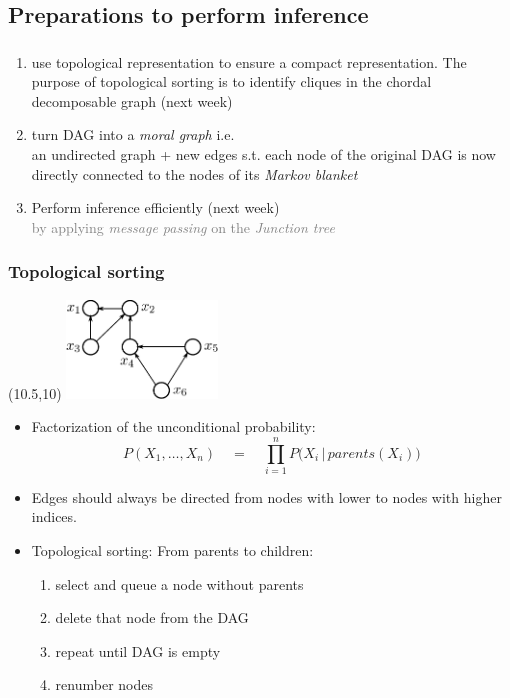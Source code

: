 \subsection{Preparations to perform inference}

\begin{frame}\frametitle{\subsecname}
    
    \begin{enumerate}
     \item use topological representation to ensure a compact representation.
     The purpose of topological sorting is to identify cliques in the chordal decomposable graph (next week)
     \item turn DAG into a \emph{moral graph} i.e. \\
     an undirected graph + new edges s.t. each node of the original DAG is now directly connected to the nodes of its \emph{Markov blanket}
     \item Perform inference efficiently (next week)\\
     \textcolor{gray}{ by applying \emph{message passing} on the \emph{Junction tree}}
    \end{enumerate}
    
\end{frame}


\begin{frame} \frametitle{Topological sorting}
	\begin{textblock}{}(10.5,10)
		\includegraphics[width=4cm]{img/section3_fig17}
	\end{textblock}

	\begin{itemize}
		\item Factorization of the unconditional probability:
		$$
				P(X_1,\ldots, X_n) \quad=\quad 
				{\textstyle\prod\limits_{i=1}^n} P\big(X_i\,|\,parents(X_i)\big)
		$$
		\vspace{4mm}
		\item Edges should always be directed from nodes with lower 
			to nodes with higher indices.
		\vspace{8mm}
		\item Topological sorting: From parents to children:
			\begin{enumerate}
				\item select and queue a node without parents
				\item delete that node from the DAG
				\item repeat until DAG is empty
				\item renumber nodes
			\end{enumerate}
		
	\end{itemize}
\end{frame}


